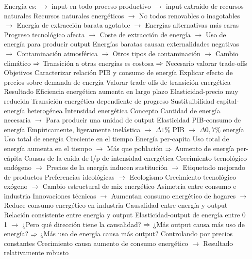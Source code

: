 \documentclass{nuevotema}
\begin{document}
\begin{esquemal}
				\4[] Energía es:
				\4[] $\to$ input en todo proceso productivo
				\4[] $\to$ input extraído de recursos naturales
				\4[] Recursos naturales energéticos
				\4[] $\to$ No todos renovables o inagotables
				\4[] $\to$ Energía de extracción barata agotable
				\4[] $\to$ Energías alternativas más caras
				\4[] Progreso tecnológico afecta
				\4[] $\to$ Coste de extracción de energía
				\4[] $\to$ Uso de energía para producir output
				\4[] Energías baratas causan externalidades negativas
				\4[] $\to$ Contaminación atmosférica
				\4[] $\to$ Otros tipos de contaminación
				\4[] $\to$ Cambio climático
				\4[] $\Rightarrow$ Transición a otras energías es costosa
				\4[] $\Rightarrow$ Necesario valorar trade-offs
				\4 Objetivos
				\4[] Caracterizar relación PIB y consumo de energía
				\4[] Explicar efecto de precios sobre demanda de energía
				\4[] Valorar trade-offs de transición energética
				\4 Resultado
				\4[] Eficiencia energética aumenta en largo plazo
				\4[] Elasticidad-precio muy reducida
				\4[] Transición energética dependiente de progreso
				\4[] Sustituibilidad capital-energía heterogénea
			\3 Intensidad energética
				\4 Concepto
				\4[] Cantidad de energía necesaria
				\4[] $\to$ Para producir una unidad de output
				\4 Elasticidad PIB-consumo de energía
				\4[] Empíricamente, ligeramente inelástica
				\4[] $\to$ $\Delta 1 \%$ PIB $\to$ $\Delta 0,7\%$ energía
				\4 Uso total de energía
				\4[] Creciente en el tiempo
				\4 Energía per-capita
				\4[] Uso total de energía aumenta en el tiempo
				\4[] $\to$ Más que población
				\4[] $\Rightarrow$ Aumento de energía per-cápita
				\4 Causas de la caída de l/p de intensidad energética
				\4[] Crecimiento tecnológico endógeno
				\4[] $\to$ Precios de la energía inducen sustitución
				\4[] $\to$ Etiquetado mejorado de productos
				\4[] Preferencias ideológicas
				\4[] $\to$ Ecologismo
				\4[] Crecimiento tecnológico exógeno
				\4[] $\to$ Cambio estructural de mix energético
				\4 Asimetría entre consumo e industria
				\4[] Innovaciones técnicas
				\4[] $\to$ Aumentan consumo energético de hogares
				\4[] $\to$ Reduce consumo energético en industria
			\3 Causalidad entre energía y output
				\4 Relación consistente entre energía y output
				\4[] Elasticidad-output de energía entre 0 1
				\4[] $\to$ ¿Pero qué dirección tiene la causalidad?
				\4[] $\Rightarrow$ ¿Más output causa más uso de energía?
				\4[] $\Rightarrow$ ¿Más uso de energía causa más output?
				\4 Controlando por precios constantes
				\4[] Crecimiento causa aumento de consumo energético
				\4[] $\to$ Resultado relativamente robusto

\end{esquemal}
\end{document}
